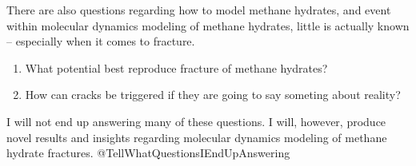 There are also questions regarding how to model methane hydrates, and event within molecular dynamics modeling of methane hydrates, little is actually known -- especially when it comes to fracture. 

\begin{enumerate}
\item What potential best reproduce fracture of methane hydrates?
\item How can cracks be triggered if they are going to say someting about reality?
\end{enumerate}

I will not end up answering many of these questions. I will, however, produce novel results and insights regarding molecular dynamics modeling of methane hydrate fractures.
@TellWhatQuestionsIEndUpAnswering